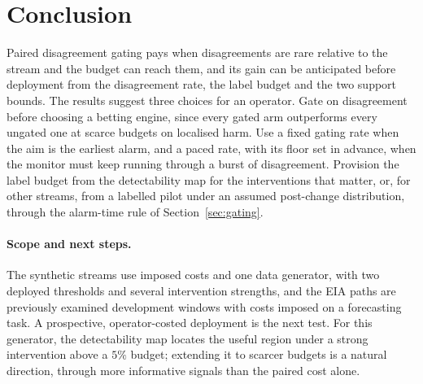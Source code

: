 \section{Conclusion}\label{sec:limits}

Paired disagreement gating pays when disagreements are rare relative to the stream and the budget can reach them, and its gain can be anticipated before deployment
from the disagreement rate, the label budget and the two support bounds. The results suggest three choices for an operator. Gate on disagreement before choosing a betting engine,
since every gated arm outperforms every ungated one at scarce budgets on localised harm. Use a fixed gating rate when the aim is the earliest alarm, and a paced rate, with its floor
set in advance, when the monitor must keep running through a burst of disagreement. Provision the label budget from the detectability map for the interventions that matter, or, for other streams, from a labelled pilot under an assumed post-change distribution, through the alarm-time rule of Section~\ref{sec:gating}.

\paragraph{Scope and next steps.}

The synthetic streams use imposed costs and one data generator, with two deployed thresholds and several intervention strengths, and the EIA paths are previously examined development windows
with costs imposed on a forecasting task. A prospective, operator-costed deployment is the next test. For this generator, the detectability map locates the useful region under a strong intervention above a $5\%$ budget;
extending it to scarcer budgets is a natural direction, through more informative signals than the paired cost alone.
